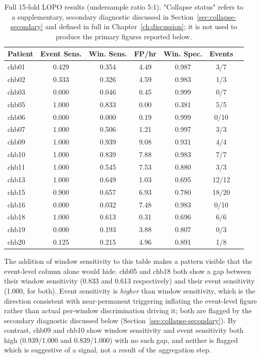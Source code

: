 \begin{table}[H]
\centering
\caption{Full 15-fold LOPO results (undersample ratio 5:1). "Collapse status" refers to a supplementary, secondary diagnostic discussed in Section~\ref{sec:collapse-secondary} and defined in full in Chapter~\ref{ch:discussion}; it is not used to produce the primary figures reported below.}\label{tab:lopo-full}
\begin{tabular}{lcccccc}
\toprule
Patient & Event Sens. & Win. Sens. & FP/hr & Win. Spec. & Events \\
\midrule
chb01 & 0.429 & 0.354 & 4.49 & 0.987 & 3/7 \\
chb02 & 0.333 & 0.326 & 4.59 & 0.983 & 1/3 \\
chb03 & 0.000 & 0.046 & 0.45 & 0.999 & 0/7 \\
chb05 & 1.000 & 0.833 & 0.00 & 0.381 & 5/5 \\
chb06 & 0.000 & 0.000 & 0.19 & 0.999 & 0/10 \\
chb07 & 1.000 & 0.506 & 1.21 & 0.997 & 3/3 \\
chb09 & 1.000 & 0.939 & 9.08 & 0.931 & 4/4 \\
chb10 & 1.000 & 0.839 & 7.88 & 0.983 & 7/7 \\
chb11 & 1.000 & 0.545 & 7.53 & 0.880 & 3/3 \\
chb13 & 1.000 & 0.649 & 1.03 & 0.695 & 12/12 \\
chb15 & 0.900 & 0.657 & 6.93 & 0.780 & 18/20 \\
chb16 & 0.000 & 0.032 & 7.48 & 0.983 & 0/10 \\
chb18 & 1.000 & 0.613 & 0.31 & 0.696 & 6/6 \\
chb19 & 0.000 & 0.193 & 3.88 & 0.807 & 0/3 \\
chb20 & 0.125 & 0.215 & 4.96 & 0.891 & 1/8 \\
\bottomrule
\end{tabular}
\end{table}

The addition of window sensitivity to this table makes a pattern visible that the event-level column alone would hide. chb05 and chb18 both show a gap between their window sensitivity (0.833 and 0.613 respectively) and their event sensitivity (1.000, for both). Event sensitivity is \emph{higher} than window sensitivity, which is the direction consistent with near-permanent triggering inflating the event-level figure rather than actual per-window discrimination driving it; both are flagged by the secondary diagnostic discussed below (Section~\ref{sec:collapse-secondary}). By contrast, chb09 and chb10 show window sensitivity and event sensitivity both high (0.939/1.000 and 0.839/1.000) with no such gap, and neither is flagged which is suggestive of a signal, not a result of the aggregation step. 
